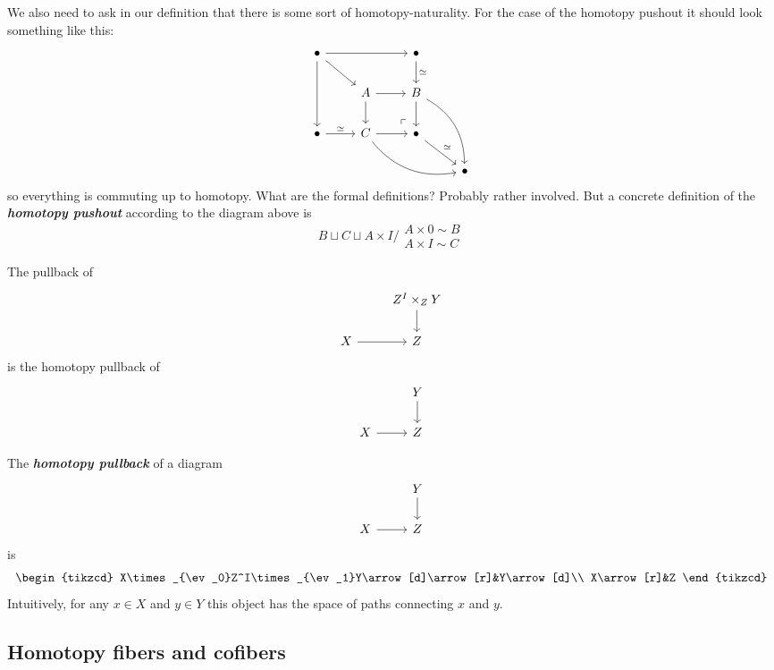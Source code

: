\begin{remark}
\begin{definition}
\begin{definition}
\end{definition}
\begin{remark}
	We also need to ask in our definition that there is some sort of homotopy-naturality. For the case of the homotopy pushout it should look something like this:
		\[\begin{tikzcd}
			\bullet\arrow[rr]\arrow[dd]\arrow[dr]&&\bullet\arrow[d,"\simeq "]\\
			&A\arrow[r]\arrow[d]&B\arrow[d]\arrow[ddr,bend left]\\
			\bullet\arrow[r,"\simeq "]&C\arrow[r]\arrow[drr,bend right]&\bullet\arrow[ul, phantom, "\ulcorner", very near start]\arrow[dr,"\simeq" ]\\
			&&&\bullet
		\end{tikzcd}\]
	so everything is commuting up to homotopy. {\color{magenta}What are the formal definitions? Probably rather involved.} But a concrete definition of the \textit{\textbf{homotopy pushout}} according to the diagram above is
	\[B\sqcup C\sqcup A\times I\Big/\substack{A\times 0\sim B \\ A\times I\sim C}\]
\end{remark}
\begin{remark}
		The pullback of
	\[\begin{tikzcd}
		&Z^I\times_ZY\arrow[d]\\
		X\arrow[r]&Z
	\end{tikzcd}\]
	is the homotopy pullback of
	\[\begin{tikzcd}
		&Y\arrow[d]\\
		X\arrow[r]&Z
	\end{tikzcd}\]
\end{remark}
\begin{definition}
	The \textbf{\textit{homotopy pullback}} of a diagram
		\[\begin{tikzcd}
			&Y\arrow[d]\\
			X\arrow[r]&Z
		\end{tikzcd}\]
		is
		\[\begin{tikzcd}
			X\times_{\ev_0}Z^I\times_{\ev_1}Y\arrow[d]\arrow[r]&Y\arrow[d]\\
			X\arrow[r]&Z
		\end{tikzcd}\]
		Intuitively, for any $x\in X$ and $y\in Y$ this object has the space of paths connecting $x$ and $y$.
\end{definition}

\subsection{Homotopy fibers and cofibers}


\end{definition}
\end{remark}
